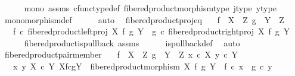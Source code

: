 \begin{isabellebody}
\ \ \ \ \isamarkupfalse%
\ mono\ assms\ cfunc{\isacharunderscore}{\kern0pt}type{\isacharunderscore}{\kern0pt}def\ fibered{\isacharunderscore}{\kern0pt}product{\isacharunderscore}{\kern0pt}morphism{\isacharunderscore}{\kern0pt}type\ j{\isacharunderscore}{\kern0pt}type\ y{\isacharunderscore}{\kern0pt}type\isanewline
\ \ \ \ \isamarkupfalse%
\ monomorphism{\isacharunderscore}{\kern0pt}def\isanewline
\ \ \ \ \isamarkupfalse%
\ auto\ \isanewline
{}\isamarkupfalse%
%
\endisatagproof
{\isafoldproof}%
%
\isadelimproof
\isanewline
%
\endisadelimproof
\isanewline
{}\isamarkupfalse%
\ fibered{\isacharunderscore}{\kern0pt}product{\isacharunderscore}{\kern0pt}proj{\isacharunderscore}{\kern0pt}eq{\isacharcolon}{\kern0pt}\isanewline
\ \ \ {\isachardoublequoteopen}f\ {\isacharcolon}{\kern0pt}\ X\ {\isasymrightarrow}\ Z{\isachardoublequoteclose}\ {\isachardoublequoteopen}g\ {\isacharcolon}{\kern0pt}\ Y\ {\isasymrightarrow}\ Z{\isachardoublequoteclose}\isanewline
\ \ \ {\isachardoublequoteopen}f\ {\isasymcirc}\isactrlsub c\ fibered{\isacharunderscore}{\kern0pt}product{\isacharunderscore}{\kern0pt}left{\isacharunderscore}{\kern0pt}proj\ X\ f\ g\ Y\ {\isacharequal}{\kern0pt}\ g\ {\isasymcirc}\isactrlsub c\ fibered{\isacharunderscore}{\kern0pt}product{\isacharunderscore}{\kern0pt}right{\isacharunderscore}{\kern0pt}proj\ X\ f\ g\ Y{\isachardoublequoteclose}\isanewline
%
\isadelimproof
\ \ \ \ %
\endisadelimproof
%
\isatagproof
{}\isamarkupfalse%
\ fibered{\isacharunderscore}{\kern0pt}product{\isacharunderscore}{\kern0pt}is{\isacharunderscore}{\kern0pt}pullback\ assms\isanewline
\ \ \ \ \isamarkupfalse%
\ is{\isacharunderscore}{\kern0pt}pullback{\isacharunderscore}{\kern0pt}def\ \isamarkupfalse%
\ auto%
\endisatagproof
{\isafoldproof}%
%
\isadelimproof
\isanewline
%
\endisadelimproof
\isanewline
{}\isamarkupfalse%
\ fibered{\isacharunderscore}{\kern0pt}product{\isacharunderscore}{\kern0pt}pair{\isacharunderscore}{\kern0pt}member{\isacharcolon}{\kern0pt}\isanewline
\ \ \ {\isachardoublequoteopen}f\ {\isacharcolon}{\kern0pt}\ X\ {\isasymrightarrow}\ Z{\isachardoublequoteclose}\ {\isachardoublequoteopen}g\ {\isacharcolon}{\kern0pt}\ Y\ {\isasymrightarrow}\ Z{\isachardoublequoteclose}\ {\isachardoublequoteopen}x\ {\isasymin}\isactrlsub c\ X{\isachardoublequoteclose}\ {\isachardoublequoteopen}y\ {\isasymin}\isactrlsub c\ Y{\isachardoublequoteclose}\isanewline
\ \ \ {\isachardoublequoteopen}{\isacharparenleft}{\kern0pt}{\isasymlangle}x{\isacharcomma}{\kern0pt}\ y{\isasymrangle}\ {\isasymin}\isactrlbsub X\ {\isasymtimes}\isactrlsub c\ Y\isactrlesub \ {\isacharparenleft}{\kern0pt}X\isactrlbsub f\isactrlesub {\isasymtimes}\isactrlsub c\isactrlbsub g\isactrlesub Y{\isacharcomma}{\kern0pt}\ \ fibered{\isacharunderscore}{\kern0pt}product{\isacharunderscore}{\kern0pt}morphism\ X\ f\ g\ Y{\isacharparenright}{\kern0pt}{\isacharparenright}{\kern0pt}\ {\isacharequal}{\kern0pt}\ {\isacharparenleft}{\kern0pt}f\ {\isasymcirc}\isactrlsub c\ x\ {\isacharequal}{\kern0pt}\ g\ {\isasymcirc}\isactrlsub c\ y{\isacharparenright}{\kern0pt}{\isachardoublequoteclose}\isanewline

\end{isabellebody}
